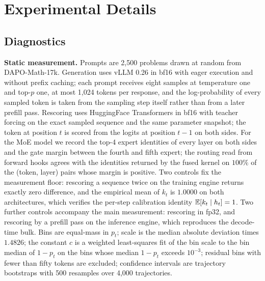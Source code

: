 \section{Experimental Details}
\label{app:experimental}

\subsection{Diagnostics}
\label{app:experimental-diagnostics}

\noindent\textbf{Static measurement.}
Prompts are 2{,}500 problems drawn at random from DAPO-Math-17k. Generation uses vLLM 0.26 in bf16 with eager execution and without prefix caching; each prompt receives eight samples at temperature one and top-$p$ one, at most 1{,}024 tokens per response, and the log-probability of every sampled token is taken from the sampling step itself rather than from a later prefill pass. Rescoring uses HuggingFace Transformers in bf16 with teacher forcing on the exact sampled sequence and the same parameter snapshot; the token at position $t$ is scored from the logits at position $t-1$ on both sides. For the MoE model we record the top-4 expert identities of every layer on both sides and the gate margin between the fourth and fifth expert; the routing read from forward hooks agrees with the identities returned by the fused kernel on $100\%$ of the (token, layer) pairs whose margin is positive. Two controls fix the measurement floor: rescoring a sequence twice on the training engine returns exactly zero difference, and the empirical mean of $k_t$ is $1.0000$ on both architectures, which verifies the per-step calibration identity $\mathbb{E}[k_t\mid h_t]=1$. Two further controls accompany the main measurement: rescoring in fp32, and rescoring by a prefill pass on the inference engine, which reproduces the decode-time bulk. Bins are equal-mass in $p_t$; scale is the median absolute deviation times $1.4826$; the constant $c$ is a weighted least-squares fit of the bin scale to the bin median of $1-p_t$ on the bins whose median $1-p_t$ exceeds $10^{-3}$; residual bins with fewer than fifty tokens are excluded; confidence intervals are trajectory bootstraps with 500 resamples over 4{,}000 trajectories.

